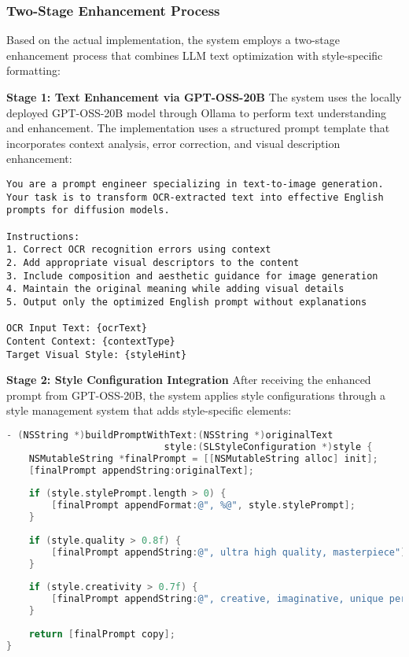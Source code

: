 \subsubsection{Two-Stage Enhancement Process}

Based on the actual implementation, the system employs a two-stage enhancement process that combines LLM text optimization with style-specific formatting:

\textbf{Stage 1: Text Enhancement via GPT-OSS-20B}
The system uses the locally deployed GPT-OSS-20B model through Ollama to perform text understanding and enhancement. The implementation uses a structured prompt template that incorporates context analysis, error correction, and visual description enhancement:

\begin{lstlisting}[language=text,basicstyle=\footnotesize\ttfamily,frame=single,breaklines=true,columns=flexible,caption={Prompt Template for GPT-OSS-20B Enhancement},label={lst:main_prompt}]
You are a prompt engineer specializing in text-to-image generation.
Your task is to transform OCR-extracted text into effective English 
prompts for diffusion models.

Instructions:
1. Correct OCR recognition errors using context
2. Add appropriate visual descriptors to the content
3. Include composition and aesthetic guidance for image generation
4. Maintain the original meaning while adding visual details
5. Output only the optimized English prompt without explanations

OCR Input Text: {ocrText}
Content Context: {contextType}
Target Visual Style: {styleHint}
\end{lstlisting}

\textbf{Stage 2: Style Configuration Integration}
After receiving the enhanced prompt from GPT-OSS-20B, the system applies style configurations through a style management system that adds style-specific elements:

\begin{lstlisting}[language=C,basicstyle=\footnotesize\ttfamily,frame=single,breaklines=true,columns=flexible,caption={Style Integration Implementation},label={lst:style_integration}]
- (NSString *)buildPromptWithText:(NSString *)originalText 
                            style:(SLStyleConfiguration *)style {
    NSMutableString *finalPrompt = [[NSMutableString alloc] init];
    [finalPrompt appendString:originalText];
    
    if (style.stylePrompt.length > 0) {
        [finalPrompt appendFormat:@", %@", style.stylePrompt];
    }
    
    if (style.quality > 0.8f) {
        [finalPrompt appendString:@", ultra high quality, masterpiece"];
    }
    
    if (style.creativity > 0.7f) {
        [finalPrompt appendString:@", creative, imaginative, unique perspective"];
    }
    
    return [finalPrompt copy];
}
\end{lstlisting}


